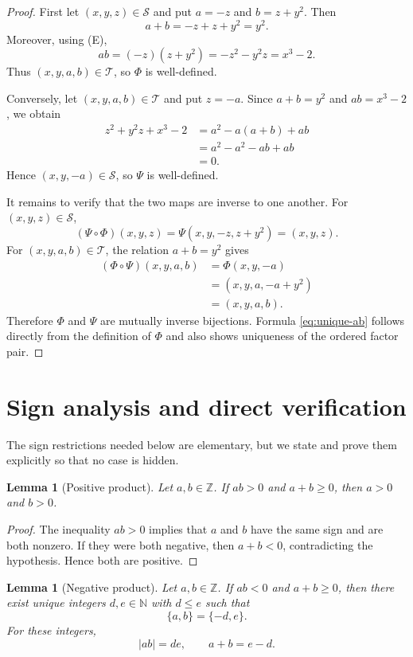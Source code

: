 \documentclass[11pt,a4paper]{article}
\newtheorem{lemma}[theorem]{Lemma}
\theoremstyle{definition}
\theoremstyle{remark}
\newcommand{\Z}{\mathbb Z}
\newcommand{\N}{\mathbb N}
\newcommand{\Sols}{\mathscr S}
\newcommand{\eqE}{\textup{(E)}}
\begin{document}
\begin{proof}
First let $(x,y,z)\in\Sols$ and put
$a=-z$ and $b=z+y^2$.  Then
\[
 a+b=-z+z+y^2=y^2.
\]
Moreover, using \eqE,
\[
 ab=(-z)(z+y^2)
    =-z^2-y^2z
    =x^3-2.
\]
Thus $(x,y,a,b)\in\mathscr T$, so $\Phi$ is well-defined.

Conversely, let $(x,y,a,b)\in\mathscr T$ and put $z=-a$.
Since $a+b=y^2$ and $ab=x^3-2$, we obtain
\begin{align*}
 z^2+y^2z+x^3-2
 &=a^2-a(a+b)+ab\\
 &=a^2-a^2-ab+ab\\
 &=0.
\end{align*}
Hence $(x,y,-a)\in\Sols$, so $\Psi$ is well-defined.

It remains to verify that the two maps are inverse to one another.  For
$(x,y,z)\in\Sols$,
\[
 (\Psi\circ\Phi)(x,y,z)
 =\Psi(x,y,-z,z+y^2)
 =(x,y,z).
\]
For $(x,y,a,b)\in\mathscr T$, the relation $a+b=y^2$ gives
\begin{align*}
 (\Phi\circ\Psi)(x,y,a,b)
 &=\Phi(x,y,-a)\\
 &=(x,y,a,-a+y^2)\\
 &=(x,y,a,b).
\end{align*}
Therefore $\Phi$ and $\Psi$ are mutually inverse bijections.  Formula
\eqref{eq:unique-ab} follows directly from the definition of $\Phi$ and also
shows uniqueness of the ordered factor pair.
\end{proof}

\section{Sign analysis and direct verification}

The sign restrictions needed below are elementary, but we state and prove
them explicitly so that no case is hidden.

\begin{lemma}[Positive product]\label{lem:positive-product}
Let $a,b\in\Z$.  If $ab>0$ and $a+b\geq0$, then $a>0$ and $b>0$.
\end{lemma}

\begin{proof}
The inequality $ab>0$ implies that $a$ and $b$ have the same sign and are
both nonzero.  If they were both negative, then $a+b<0$, contradicting the
hypothesis.  Hence both are positive.
\end{proof}

\begin{lemma}[Negative product]\label{lem:negative-product}
Let $a,b\in\Z$.  If $ab<0$ and $a+b\geq0$, then there exist unique integers
$d,e\in\N$ with $d\leq e$ such that
\[
 \{a,b\}=\{-d,e\}.
\]
For these integers,
\[
 |ab|=de,
 \qquad
 a+b=e-d.
\]
\end{lemma}
\end{document}
